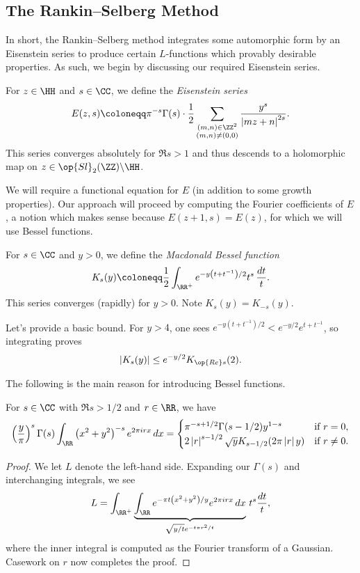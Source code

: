 \documentclass{article}
\begin{document}
\subsection{The Rankin--Selberg Method}
In short, the Rankin--Selberg method integrates some automorphic form by an Eisenstein series to produce certain $L$-functions which provably desirable properties. As such, we begin by discussing our required Eisenstein series.
\begin{definition}
	For $z\in\HH$ and $s\in\CC$, we define the \textit{Eisenstein series}
	\[E(z,s)\coloneqq\pi^{-s}\Gamma(s)\cdot\frac12\sum_{\substack{(m,n)\in\ZZ^2\\(m,n)\ne(0,0)}}\frac{y^s}{\left|mz+n\right|^{2s}}.\]
	This series converges absolutely for $\Re s>1$ and thus descends to a holomorphic map on $z\in\op{Sl}_2(\ZZ)\backslash\HH$.
\end{definition}
We will require a functional equation for $E$ (in addition to some growth properties). Our approach will proceed by computing the Fourier coefficients of $E$, a notion which makes sense because $E(z+1,s)=E(z)$, for which we will use Bessel functions.
\begin{definition}
	For $s\in\CC$ and $y>0$, we define the \textit{Macdonald Bessel function}
	\[K_s(y)\coloneqq\frac12\int_{\RR^+}e^{-y\left(t+t^{-1}\right)/2}t^s\,\frac{dt}t.\]
	This series converges (rapidly) for $y>0$. Note $K_s(y)=K_{-s}(y)$.
\end{definition}
\begin{remark} \label{rem:rapid-decay-bessel}
	Let's provide a basic bound. For $y>4$, one sees $e^{-y\left(t+t^{-1}\right)/2}<e^{-y/2}e^{t+t^{-1}}$, so integrating proves
	\[\left|K_s(y)\right|\le e^{-y/2}K_{\op{Re}s}(2).\]
\end{remark}
The following is the main reason for introducing Bessel functions.
\begin{lemma} \label{lem:use-bessel}
	For $s\in\CC$ with $\Re s>1/2$ and $r\in\RR$, we have
	\[\left(\frac y\pi\right)^s\Gamma(s)\int_\RR\left(x^2+y^2\right)^{-s}e^{2\pi irx}\,dx=\begin{cases}
		\pi^{-s+1/2}\Gamma(s-1/2)y^{1-s} & \text{if }r=0, \\
		2\left|r\right|^{s-1/2}\sqrt yK_{s-1/2}(2\pi\left|r\right|y) & \text{if }r\ne0.
	\end{cases}\]
\end{lemma}
\begin{proof}
	We let $L$ denote the left-hand side. Expanding our $\Gamma(s)$ and interchanging integrals, we see
	\[L=\int_{\RR^+}\underbrace{\int_\RR e^{-\pi t\left(x^2+y^2\right)/y}e^{2\pi irx}\,dx}_{\sqrt{y/t}e^{-t\pi r^2/t}}\,t^s\frac{dt}t,\]
	where the inner integral is computed as the Fourier transform of a Gaussian. Casework on $r$ now completes the proof.
\end{proof}
\end{document}
